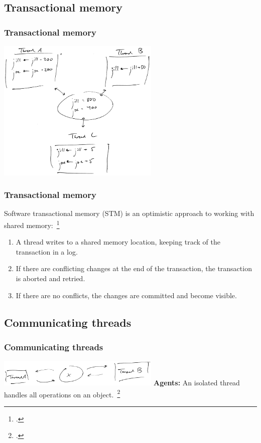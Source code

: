 \documentclass[aspectratio=1610]{beamer}
\begin{document}
  \subsection{Transactional memory}

  \begin{frame}
    \frametitle{Transactional memory}
    \centering

    \includegraphics[width=220pt]{../figures/stm}
  \end{frame}

  \begin{frame}
    \frametitle{Transactional memory}

    Software transactional memory (STM) is an optimistic approach to working with shared memory:~\footcite{Shavit1995}

    \begin{enumerate}
      \item A thread writes to a shared memory location, keeping track of the transaction in a log.
      \item If there are conflicting changes at the end of the transaction, the transaction is aborted and retried.
      \item If there are no conflicts, the changes are committed and become visible.
    \end{enumerate}
  \end{frame}

  \subsection{Communicating threads}

  \begin{frame}
    \frametitle{Communicating threads}
    \centering

    \includegraphics[width=220pt]{../figures/agent}
    \vfill
    \textbf{Agents:} An isolated thread handles all operations on an object.~\footcite{Swalens2014}
  \end{frame}
\end{document}
